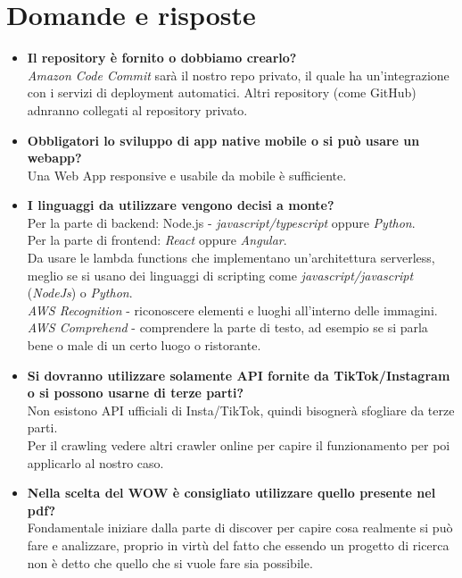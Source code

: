 \documentclass{classes/base}
\begin{document}
    \section*{Domande e risposte}
    \begin{itemize}
        \item  \textbf{Il repository è fornito o dobbiamo crearlo?}
        \\\textit{Amazon Code Commit} sarà il nostro repo privato, il quale ha un’integrazione con i servizi di deployment automatici.
        Altri repository (come GitHub) adnranno collegati al repository privato.        
        \item  \textbf{Obbligatori lo sviluppo di app native mobile o si può usare un webapp?}
        \\Una Web App responsive e usabile da mobile è sufficiente.
        \item  \textbf{I linguaggi da utilizzare vengono decisi a monte?} 
        \\Per la parte di backend: Node.js - \textit{javascript/typescript} oppure \textit{Python}.\\
            Per la parte di frontend: \textit{React} oppure \textit{Angular}.\\
            Da usare le lambda functions che implementano un’architettura serverless, meglio se si usano dei linguaggi di scripting come \textit{javascript/javascript} (\textit{NodeJs}) o \textit{Python}.\\
            \textit{AWS Recognition} - riconoscere elementi e luoghi all'interno delle immagini.\\
            \textit{AWS Comprehend} - comprendere la parte di testo, ad esempio se si parla bene o male di un certo luogo o ristorante.
        \item  \textbf{Si dovranno utilizzare solamente API fornite da TikTok/Instagram o si possono usarne di terze parti?}
        \\Non esistono API ufficiali di Insta/TikTok, quindi bisognerà sfogliare da terze parti.\\
            Per il crawling vedere altri crawler online per capire il funzionamento per poi applicarlo al nostro caso.
        \item  \textbf{Nella scelta del WOW è consigliato utilizzare quello presente nel pdf?}
        \\Fondamentale iniziare dalla parte di discover per capire cosa realmente si può fare e analizzare, proprio in virtù del fatto che essendo un progetto di ricerca non è detto che quello che si vuole fare sia possibile. 

\end{itemize}
\end{document}
